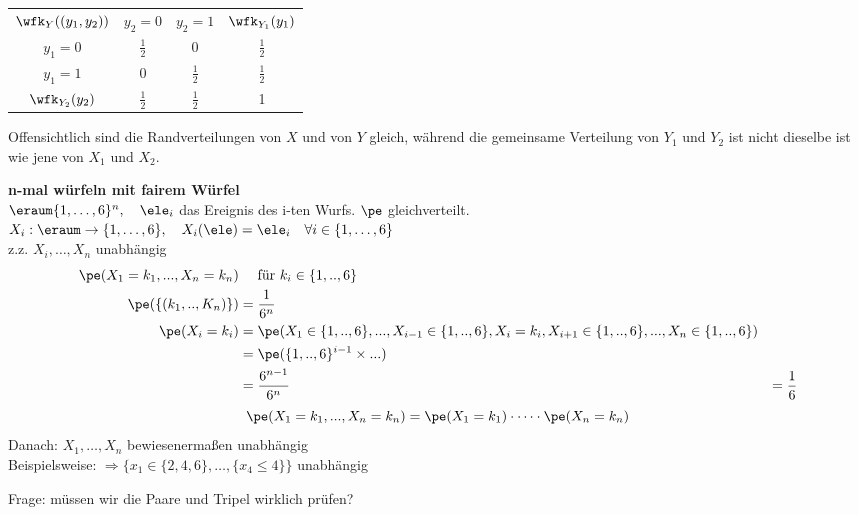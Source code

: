 \begin{bsp}
\begin{table}[H]
        \begin{tabular}{cccc}
            $\wfk_Y ((y_1, y_2))$ & $y_2 = 0$     & $y_2 = 1$     & $\wfk_{Y_1}(y_1)$ \\
            $y_1 = 0$             & $\frac{1}{2}$ & 0             & $\frac{1}{2}$     \\
            $y_1 = 1$             & 0             & $\frac{1}{2}$ & $\frac{1}{2}$     \\
            $\wfk_{Y_2}(y_2)$     & $\frac{1}{2}$ & $\frac{1}{2}$ & 1
        \end{tabular}\label{tab:table}
    \end{table}
    Offensichtlich sind die Randverteilungen von $X$ und von $Y$ gleich, während die gemeinsame Verteilung
    von $Y_1$ und $Y_2$ ist nicht dieselbe ist wie jene von $X_1$ und $X_2$.
\end{bsp}

\begin{bsp}
    \textbf{n-mal würfeln mit fairem Würfel}   \\
    $\eraum \{1,\dots,6\}^n, \quad \ele_i$ das Ereignis des i-ten Wurfs. $\pe$ gleichverteilt. \\
    $X_i: \eraum \rightarrow \{1,\dots ,6 \}, \quad X_i(\ele) = \ele_i \quad \forall i \in \{1,\dots ,6 \}$ \\
    z.z. $X_i, \dots, X_n$ unabhängig \\
    \begin{align*}
        \pe(X_1=k_1, ..., X_n= k_n) & \quad \text{ für } k_i \in \{1,..,6\} \\
        \pe(\{(k_1,..,K_n)\}) & = \frac{1}{6^n}\\
        \pe(X_i = k_i)  & =
        \pe(X_1\in \{1,..,6\}, ..., X_{i-1} \in \{1,..,6\}, X_i = k_i, X_{i+1} \in \{1,..,6\}, ..., X_n \in \{1,..,6\}) \\
        & = \pe(\{1,..,6\}^{i-1} \times ...) \\
        & = \frac{6^{n-1}}{6^n}
        & = \frac{1}{6}
    \end{align*}
    \[
        \pe(X_1 = k_1, ..., X_n = k_n)  = \pe(X_1 = k_1) \cdot \dots \cdot \pe(X_n = k_n)
    \]
    Danach: $X_1, \dots, X_n$ bewiesenermaßen unabhängig \\
    Beispielsweise:
    $\Rightarrow \{x_1 \in \{2,4,6\}, \dots, \{x_4 \leq 4\}\}$ unabhängig \\
\end{bsp}
Frage: müssen wir die Paare und Tripel wirklich prüfen?


